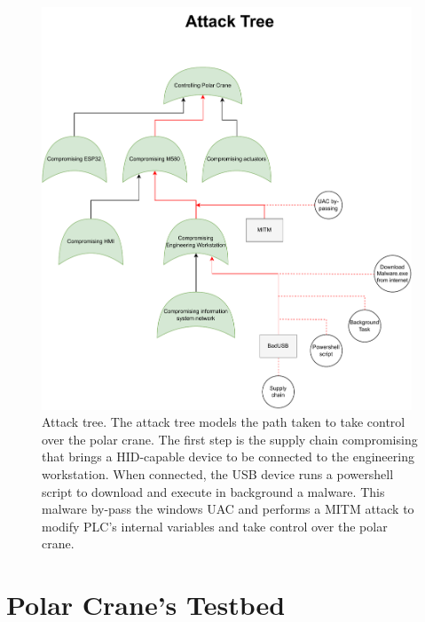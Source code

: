 \begin{figure}
    \centering
    \vspace{2cm}
    \includegraphics[height=12cm, angle=90, trim={0cm 0cm 0cm 2cm},clip]{figures/Threat-modelling-Attack Tree.pdf}
    \caption{Attack tree. The attack tree models the path taken to take control over the polar crane. The first step is the supply chain compromising that brings a HID-capable device to be connected to the engineering workstation. When connected, the USB device runs a powershell script to download and execute in background a malware. This malware by-pass the windows UAC and performs a MITM attack to modify PLC's internal variables and take control over the polar crane.}
    \label{fig:atk-tree}
\end{figure}

\chapter{Polar Crane's Testbed}


